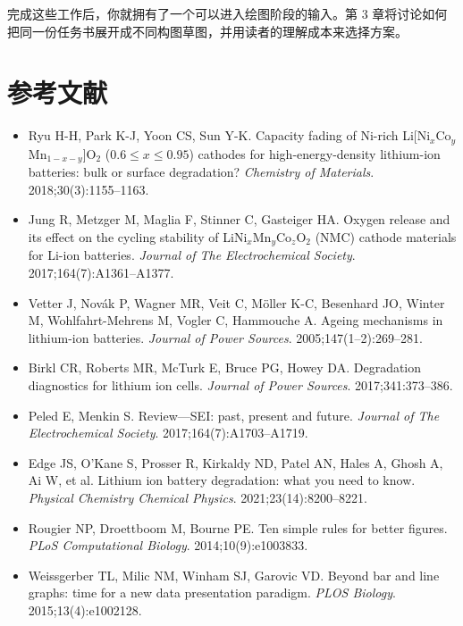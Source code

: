 完成这些工作后，你就拥有了一个可以进入绘图阶段的输入。第 3 章将讨论如何把同一份任务书展开成不同构图草图，并用读者的理解成本来选择方案。

\section*{参考文献}

{\sloppy
\begin{itemize}
\item Ryu H-H, Park K-J, Yoon CS, Sun Y-K. Capacity fading of Ni-rich Li[Ni$_x$Co$_y$Mn$_{1-x-y}$]O$_2$ ($0.6 \le x \le 0.95$) cathodes for high-energy-density lithium-ion batteries: bulk or surface degradation? \emph{Chemistry of Materials}. 2018;30(3):1155--1163. 
\item Jung R, Metzger M, Maglia F, Stinner C, Gasteiger HA. Oxygen release and its effect on the cycling stability of LiNi$_x$Mn$_y$Co$_z$O$_2$ (NMC) cathode materials for Li-ion batteries. \emph{Journal of The Electrochemical Society}. 2017;164(7):A1361--A1377. 
\item Vetter J, Nov\'ak P, Wagner MR, Veit C, M\"oller K-C, Besenhard JO, Winter M, Wohlfahrt-Mehrens M, Vogler C, Hammouche A. Ageing mechanisms in lithium-ion batteries. \emph{Journal of Power Sources}. 2005;147(1--2):269--281. 
\item Birkl CR, Roberts MR, McTurk E, Bruce PG, Howey DA. Degradation diagnostics for lithium ion cells. \emph{Journal of Power Sources}. 2017;341:373--386. 
\item Peled E, Menkin S. Review---SEI: past, present and future. \emph{Journal of The Electrochemical Society}. 2017;164(7):A1703--A1719. 
\item Edge JS, O'Kane S, Prosser R, Kirkaldy ND, Patel AN, Hales A, Ghosh A, Ai W, et al. Lithium ion battery degradation: what you need to know. \emph{Physical Chemistry Chemical Physics}. 2021;23(14):8200--8221. 
\item Rougier NP, Droettboom M, Bourne PE. Ten simple rules for better figures. \emph{PLoS Computational Biology}. 2014;10(9):e1003833. 
\item Weissgerber TL, Milic NM, Winham SJ, Garovic VD. Beyond bar and line graphs: time for a new data presentation paradigm. \emph{PLOS Biology}. 2015;13(4):e1002128. 
\end{itemize}
\par}
